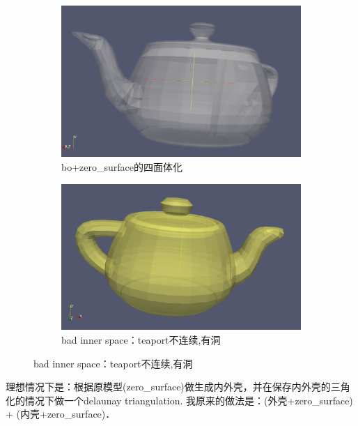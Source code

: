 \documentclass{article}
\theoremstyle{definition}
\theoremstyle{remark}
\begin{document}
  \begin{figure}
    \begin{subfigure}[b]{0.4\textwidth}
      \includegraphics[width=\textwidth]{bad_inner_space0.png}
      \caption[现象]{bo+zero\_surface的四面体化}
    \end{subfigure}
    \begin{subfigure}[b]{0.4\textwidth}
      \includegraphics[width=\textwidth]{bad_inner_space1.png}
      \caption[原因]{bad inner space：teaport不连续,有洞}
    \end{subfigure}
  \end{figure}
  理想情况下是：根据原模型(zero\_surface)做生成内外壳，并在保存内外壳的三角化的情况下做一个delaunay triangulation.
  我原来的做法是：(外壳+zero\_surface) + (内壳+zero\_surface)．
\end{document}

